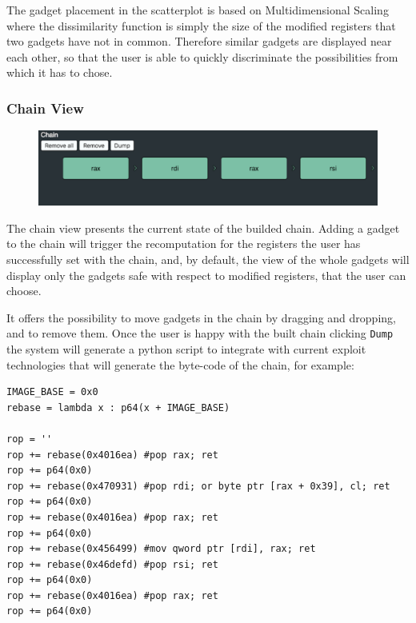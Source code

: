 \documentclass[twocolumn, 11pt]{article}
\begin{document}
The gadget placement in the scatterplot is based on Multidimensional Scaling where the dissimilarity function is simply the size of the modified registers that two gadgets have not in common. Therefore similar gadgets are displayed near each other, so that the user is able to quickly discriminate the possibilities from which it has to chose.

\subsubsection{Chain View}
\begin{figure}[htb]
  \centering
  \includegraphics[width=0.7\linewidth]{chain-view}
\end{figure}

The chain view presents the current state of the builded chain. Adding a gadget to the chain will trigger the recomputation for the registers the user has successfully set with the chain, and, by default, the view of the whole gadgets will display only the gadgets safe with respect to modified registers, that the user can choose.

It offers the possibility to move gadgets in the chain by dragging and dropping, and to remove them. Once the user is happy with the built chain clicking {\tt Dump} the system will generate a python script to integrate with current exploit technologies that will generate the byte-code of the chain, for example:


\begin{lstlisting}
IMAGE_BASE = 0x0
rebase = lambda x : p64(x + IMAGE_BASE)

rop = ''
rop += rebase(0x4016ea) #pop rax; ret
rop += p64(0x0)
rop += rebase(0x470931) #pop rdi; or byte ptr [rax + 0x39], cl; ret
rop += p64(0x0)
rop += rebase(0x4016ea) #pop rax; ret
rop += p64(0x0)
rop += rebase(0x456499) #mov qword ptr [rdi], rax; ret
rop += rebase(0x46defd) #pop rsi; ret
rop += p64(0x0)
rop += rebase(0x4016ea) #pop rax; ret
rop += p64(0x0)
\end{lstlisting}
\end{document}
